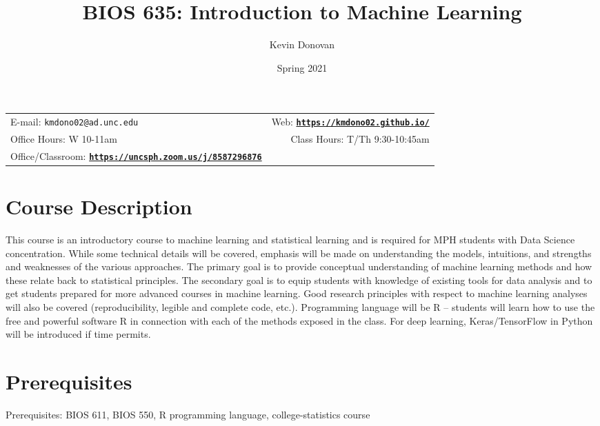 \documentclass[11pt]{article}
\title{BIOS 635: Introduction to Machine Learning}
\author{Kevin Donovan}
\date{Spring 2021}
\newcommand{\blankline}{\quad\pagebreak[2]}
\begin{document}
\maketitle

\blankline

\begin{tabular*}{.93\textwidth}{@{\extracolsep{\fill}}lr}


E-mail: \texttt{kmdono02@ad.unc.edu} & Web: \href{https://kmdono02.github.io/}{\tt\bf https://kmdono02.github.io/}  \\

 Office Hours: W 10-11am  &  Class Hours: T/Th 9:30-10:45am \\

 Office/Classroom: \href{https://uncsph.zoom.us/j/8587296876}{\tt\bf https://uncsph.zoom.us/j/8587296876} \\
\hline
\end{tabular*}

\vspace{5 mm}

\section*{Course Description}
This course is an introductory course to machine learning and statistical learning and is required for MPH students with Data Science concentration. While some technical details will be covered, emphasis will be made on understanding the models, intuitions, and strengths and weaknesses of the various approaches.  The primary goal is to provide conceptual understanding of machine learning methods and how these relate back to statistical principles.  The secondary goal is to equip students with knowledge of existing tools for data analysis and to get students prepared for more advanced courses in machine learning. Good research principles with respect to machine learning analyses will also be covered (reproducibility, legible and complete code, etc.).  Programming language will be R – students will learn how to use the free and powerful software R in connection with each of the methods exposed in the class. For deep learning, Keras/TensorFlow in Python will be introduced if time permits.

\section*{Prerequisites}
Prerequisites: BIOS 611, BIOS 550, R programming language, college-statistics course
\end{document}
